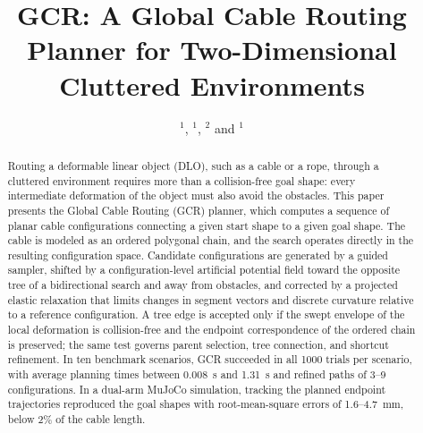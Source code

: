 \documentclass{pas}
\begin{document}



\title{GCR: A Global Cable Routing Planner for Two-Dimensional Cluttered Environments}

\author{ $^{1}$,  $^{1}$,  $^{2}$ and  $^{1}$}







\begin{abstract}
Routing a deformable linear object (DLO), such as a cable or a rope, through a cluttered environment requires more than a collision-free goal shape: every intermediate deformation of the object must also avoid the obstacles. This paper presents the Global Cable Routing (GCR) planner, which computes a sequence of planar cable configurations connecting a given start shape to a given goal shape. The cable is modeled as an ordered polygonal chain, and the search operates directly in the resulting configuration space. Candidate configurations are generated by a guided sampler, shifted by a configuration-level artificial potential field toward the opposite tree of a bidirectional search and away from obstacles, and corrected by a projected elastic relaxation that limits changes in segment vectors and discrete curvature relative to a reference configuration. A tree edge is accepted only if the swept envelope of the local deformation is collision-free and the endpoint correspondence of the ordered chain is preserved; the same test governs parent selection, tree connection, and shortcut refinement. In ten benchmark scenarios, GCR succeeded in all 1000 trials per scenario, with average planning times between 0.008~s and 1.31~s and refined paths of 3--9 configurations. In a dual-arm MuJoCo simulation, tracking the planned endpoint trajectories reproduced the goal shapes with root-mean-square errors of 1.6--4.7~mm, below 2\% of the cable length.
\end{abstract}
\end{document}
